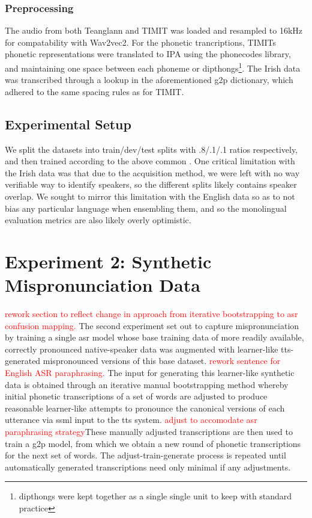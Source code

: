 \documentclass[thesis]{cluu}
\newcommand{\todo}[1]{\textcolor{red}{#1}}
\begin{document}
\subsubsection{Preprocessing}
The audio from both Teanglann and TIMIT was loaded and resampled to 16kHz for compatability with Wav2vec2. For the phonetic trancriptions, TIMITs phonetic representations were translated to IPA using the phonecodes library, and maintaining one space between each phoneme or dipthongs\footnote{dipthongs were kept together as a single single unit to keep with standard practice}. The Irish data was transcribed through a lookup in the aforementioned \gls{g2p} dictionary, which adhered to the same spacing rules as for TIMIT.

\subsection{Experimental Setup}
We split the datasets into train/dev/test splits with .8/.1/.1 ratios respectively, and then trained according to the above common . One critical limitation with the Irish data was that due to the acquisition method, we were left with no way verifiable way to identify speakers, so the different splits likely contains speaker overlap. We sought to mirror this limitation with the English data so as to not bias any particular language when ensembling them, and so the monolingual evaluation metrics are also likely overly optimistic. 

\section{Experiment 2: Synthetic Mispronunciation Data}
\todo{rework section to reflect change in approach from iterative bootstrapping to asr confusion mapping.}
The second experiment set out to capture mispronunciation by training a single \gls{asr} model whose base training data of more readily available, correctly pronounced native-speaker data was augmented with learner-like \gls{tts}-generated mispronounced versions of this base dataset. \todo{rework sentence for English ASR paraphrasing.} The input for generating this learner-like synthetic data is obtained through an iterative manual bootstrapping method whereby initial phonetic transcriptions of a set of words are adjusted to produce reasonable learner-like attempts to pronounce the canonical versions of each utterance via \gls{ssml} input to the \gls{tts} system. \todo{adjust to accomodate asr paraphrasing strategy}These manually adjusted transcriptions are then used to train a \gls{g2p} model, from which we obtain a new round of phonetic transcriptions for the next set of words. The adjust-train-generate process is repeated until automatically generated transcriptions need only minimal if any adjustments.
\end{document}
